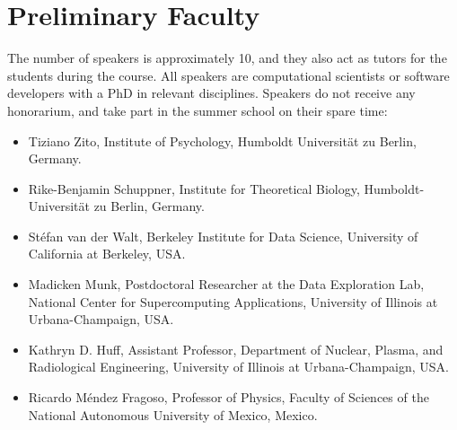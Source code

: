 \documentclass{article}[11pt]
\begin{document}
\section*{Preliminary Faculty}
The number of speakers is approximately 10, and they also act as tutors for
the students during the course. All speakers are computational scientists or
software developers with a PhD in relevant disciplines. Speakers do not
receive any honorarium, and take part in the summer school on their spare time:
\begin{itemize}
\item Tiziano Zito, Institute of Psychology, Humboldt Universit\"at zu Berlin,
Germany.

\item Rike-Benjamin Schuppner, Institute for Theoretical Biology, Humboldt-
Universit\"at zu Berlin, Germany.

\item St\'efan van der Walt, Berkeley Institute for Data Science, University
of California at Berkeley, USA.

\item Madicken Munk, Postdoctoral Researcher at the  Data Exploration Lab,
National Center for Supercomputing Applications, University of Illinois at
Urbana-Champaign, USA.

\item Kathryn D. Huff, Assistant Professor, Department of Nuclear, Plasma, and
Radiological Engineering, University of Illinois at Urbana-Champaign, USA.

\item Ricardo M\'endez Fragoso, Professor of Physics, Faculty of Sciences of
the National Autonomous University of Mexico, Mexico.
\end{itemize}
\end{document}
